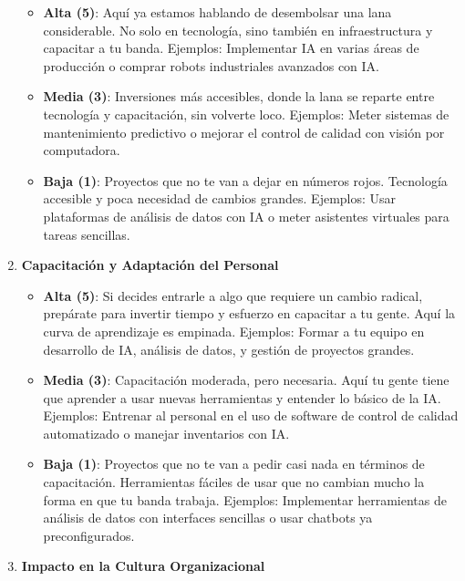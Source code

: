\documentclass[
  10pt,
  letterpaper,
]{book}
\providecommand{\tightlist}{%
  \setlength{\itemsep}{0pt}\setlength{\parskip}{0pt}}\usepackage{longtable,booktabs,array}
\begin{document}
\begin{enumerate}
  \begin{itemize}
  \tightlist
  \item
    \textbf{Alta (5)}: Aquí ya estamos hablando de desembolsar una lana
    considerable. No solo en tecnología, sino también en infraestructura
    y capacitar a tu banda. Ejemplos: Implementar IA en varias áreas de
    producción o comprar robots industriales avanzados con IA.
  \item
    \textbf{Media (3)}: Inversiones más accesibles, donde la lana se
    reparte entre tecnología y capacitación, sin volverte loco.
    Ejemplos: Meter sistemas de mantenimiento predictivo o mejorar el
    control de calidad con visión por computadora.
  \item
    \textbf{Baja (1)}: Proyectos que no te van a dejar en números rojos.
    Tecnología accesible y poca necesidad de cambios grandes. Ejemplos:
    Usar plataformas de análisis de datos con IA o meter asistentes
    virtuales para tareas sencillas.
  \end{itemize}
\item
  \textbf{Capacitación y Adaptación del Personal}

  \begin{itemize}
  \tightlist
  \item
    \textbf{Alta (5)}: Si decides entrarle a algo que requiere un cambio
    radical, prepárate para invertir tiempo y esfuerzo en capacitar a tu
    gente. Aquí la curva de aprendizaje es empinada. Ejemplos: Formar a
    tu equipo en desarrollo de IA, análisis de datos, y gestión de
    proyectos grandes.
  \item
    \textbf{Media (3)}: Capacitación moderada, pero necesaria. Aquí tu
    gente tiene que aprender a usar nuevas herramientas y entender lo
    básico de la IA. Ejemplos: Entrenar al personal en el uso de
    software de control de calidad automatizado o manejar inventarios
    con IA.
  \item
    \textbf{Baja (1)}: Proyectos que no te van a pedir casi nada en
    términos de capacitación. Herramientas fáciles de usar que no
    cambian mucho la forma en que tu banda trabaja. Ejemplos:
    Implementar herramientas de análisis de datos con interfaces
    sencillas o usar chatbots ya preconfigurados.
  \end{itemize}
\item
  \textbf{Impacto en la Cultura Organizacional}


\end{enumerate}
\end{document}

